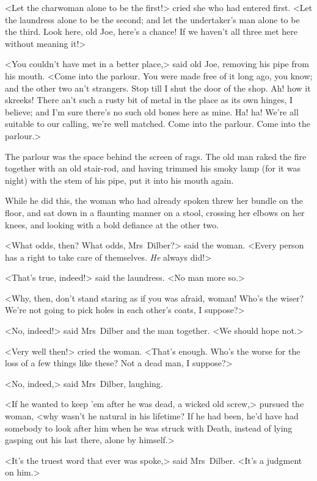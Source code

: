 <Let the charwoman alone to be the first!> cried she who had en\-tered first. <Let the laundress alone to be the second; and let the undertaker's man alone to be the third. Look here, old Joe, here's a chance! If we haven't all three met here without meaning it!>

<You couldn't have met in a better place,> said old Joe, removing his pipe from his mouth. <Come into the parlour. You were made free of it long ago, you know; and the other two an't strangers. Stop till I shut the door of the shop. Ah! how it skreeks! There an't such a rusty bit of metal in the place as its own hinges, I believe; and I'm sure there's no such old bones here as mine. Ha! ha! We're all suitable to our calling, we're well matched. Come into the parlour. Come into the parlour.>

The parlour was the space behind the screen of rags. The old man raked the fire together with an old stair-rod, and having  trimmed his smoky lamp (for it was night) with the stem of his pipe, put it into his mouth again.

While he did this, the woman who had already spoken threw her bundle on the floor, and sat down in a flaunting manner on a stool, crossing her elbows on her knees, and looking with a bold defiance at the other two.

<What odds, then? What odds, Mrs~Dilber?> said the woman. <Every person has a right to take care of themselves. \textit{He} always did!>

<That's true, indeed!> said the laundress. <No man more so.>

<Why, then, don't stand staring as if you was afraid, woman! Who's the wiser? We're not going to pick holes in each other's coats, I suppose?>

<No, indeed!> said Mrs~Dilber and the man together. <We should hope not.>

<Very well then!> cried the woman. <That's enough. Who's the worse for the loss of a few things like these? Not a dead man, I suppose?>

<No, indeed,> said Mrs~Dilber, laughing.

<If he wanted to keep 'em after he was dead, a wicked old screw,> pursued the woman, <why wasn't he natural in his lifetime? If he had been, he'd have had somebody to look after him when he was struck with Death, instead of lying gasping out his last there, alone by himself.>

<It's the truest word that ever was spoke,> said Mrs~Dilber. <It's a judgment on him.>

